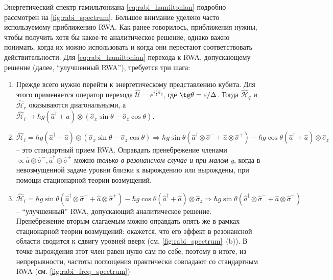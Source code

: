 \documentclass[12pt, twoside]{report}
\numberwithin{equation}{section}
\numberwithin{figure}{section}
\begin{document}
Энергетический спектр гамильтониана \eqref{eq:rabi_hamiltonian} подробно рассмотрен на \autoref{fig:rabi_spectrum}. Большое внимание уделено часто используемому приближению RWA. Как ранее говорилось, приближения нужны, чтобы получить хотя бы какое-то аналитическое решение, однако важно понимать, когда их можно использовать и когда они перестают соответствовать действительности\cite{niemczyk2010, forn2010}. Для \eqref{eq:rabi_hamiltonian} перехода к RWA, допускающему решение (далее, ``улучшенный RWA''), требуется три шага:
\begin{enumerate}
\item \label{itm:first} Прежде всего нужно перейти к энергетическому представлению кубита. Для этого применяется оператор перехода $\mathcal{\hat U} = e^{i\frac{\theta}{2}\hat \sigma_y}$, где $\tg \theta = \varepsilon/\Delta$. Тогда $\hat{\mathcal{H}}_{q}$ и $\hat{\mathcal{H}}_{r}$ оказываются диагональными, а $\mathcal{\hat H}_i \rightarrow \hbar g (\hat a^\dag + \hat a) \otimes \left( \hat \sigma_x \sin\theta - \hat\sigma_z \cos\theta \right)$.

\item $\mathcal{\hat H}_i = \hbar g (\hat a^\dag + \hat a) \otimes \left( \hat \sigma_x \sin\theta-  \hat\sigma_z \cos\theta \right) \Rightarrow \hbar g \sin\theta \left(\hat a^\dag \otimes \hat \sigma^- + \hat a \otimes \hat \sigma^+\right) - \hbar g\cos\theta (\hat a^\dag + \hat a) \otimes \hat\sigma_z $ -- это стандартный прием RWA. Оправдать пренебрежение членами $\propto \hat a \otimes \hat \sigma^-, \hat a^{\dag} \otimes \hat \sigma^+$ можно \textit{только в резонансном случае и при малом g}, когда в невозмущенной задаче уровни близки к вырождению или вырождены, при помощи стационарной теории возмущений.

\item $\mathcal{\hat H}_i =\hbar g \sin\theta \left(\hat a^\dag \otimes \hat \sigma^- + \hat a \otimes \hat \sigma^+\right) -\hbar g\cos\theta (\hat a^\dag + \hat a) \otimes \hat\sigma_z \Rightarrow  \hbar g \sin\theta \left(\hat a^\dag \otimes \hat \sigma^- + \hat a \otimes \hat \sigma^+\right)$  -- ``улучшенный'' RWA, допускающий аналитическое решение. Пренебрежение вторым слагаемым можно оправдать опять же в рамках стационарной теории возмущений: окажется, что его эффект в резонансной области сводится к сдвигу уровней вверх (см. \autoref{fig:rabi_spectrum}~(b)). В точке вырождения этот член равен нулю сам по себе, поэтому в итоге, из непрерывности, частоты поглощения практически совпадают со стандартным RWA (см. \autoref{fig:rabi_freq_spectrum})
\end{enumerate}
\end{document}
